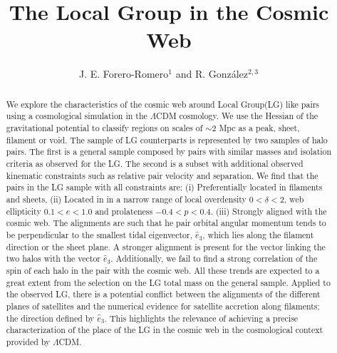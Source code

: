 \documentclass{emulateapj}
\begin{document}

\title{The Local Group in the Cosmic Web}
\author{J. E. Forero-Romero$^1$ and R. Gonz\'alez$^{2,3}$}

\begin{abstract}
We explore the characteristics of the
cosmic web around Local Group(LG) like pairs  using a cosmological simulation in the
$\Lambda$CDM cosmology.  
We use the Hessian of the gravitational potential to classify regions
on scales of $\sim 2$ Mpc as a peak, sheet, filament or void.  
The sample of LG counterparts is represented by two samples of halo
pairs. 
The first is a general sample composed by pairs with
similar masses and isolation criteria as observed for the LG.  
The second is a subset with additional observed kinematic constraints 
such as relative pair velocity and separation. 
We find that the pairs in the LG sample with all constraints are: (i)
Preferentially   located in filaments and sheets, (ii) Located in in a
narrow range of local overdensity $0<\delta<2$, web ellipticity $0.1<e<1.0$ and
prolateness $-0.4<p<0.4$.  (iii) Strongly aligned with the cosmic web.
The alignments are such that he pair orbital angular momentum tends to
be perpendicular to the smallest tidal eigenvector, $\hat{e}_3$, which
lies along the filament direction or the sheet plane.
A stronger alignment is present for the vector linking the two halos with the vector $\hat{e}_3$. Additionally, we fail to find a strong correlation of the spin of each halo in the pair with the cosmic web.
All these trends are expected to a great extent from the selection on
the LG total mass on the general sample. 
Applied to the observed LG, there is a potential conflict between
the alignments of the different planes of satellites and the numerical
evidence for satellite accretion along filaments; the direction
defined by $\hat{e}_3$. This highlights the relevance of achieving a
precise characterization of the place of the LG in the cosmic web in
the cosmological context provided by $\Lambda$CDM. 


\end{abstract}
\end{document}
